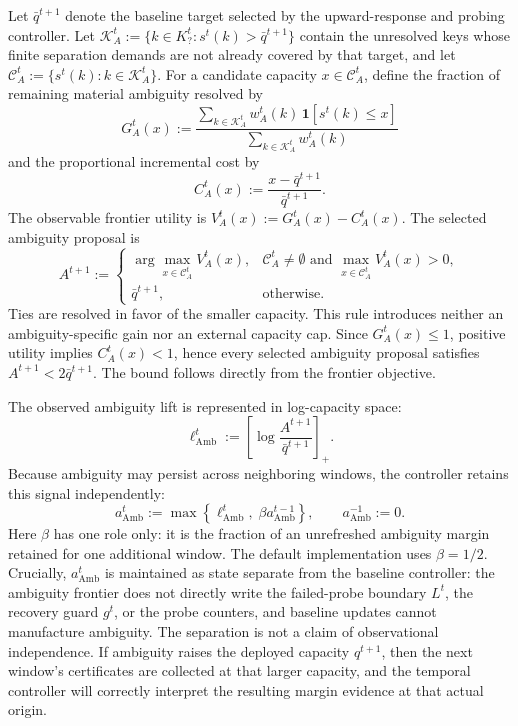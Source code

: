 \documentclass[sigconf, nonacm]{acmart}
\begin{document}
Let \(\bar q^{t+1}\) denote the baseline target selected by the upward-response and probing controller. Let \(\mathcal K_A^t:=\{k\in K_?^t:s^t(k)>\bar q^{t+1}\}\) contain the unresolved keys whose finite separation demands are not already covered by that target, and let \(\mathcal C_A^t:=\{s^t(k):k\in\mathcal K_A^t\}\). For a candidate capacity \(x\in\mathcal C_A^t\), define the fraction of remaining material ambiguity resolved by
\begin{equation}
\label{eq:ambiguity-gain}
G_A^t(x)
:=
\frac{\sum_{k\in\mathcal K_A^t}
w_A^t(k)\,
\mathbf 1[s^t(k)\le x]}
{\sum_{k\in\mathcal K_A^t}w_A^t(k)}
\end{equation}
and the proportional incremental cost by
\begin{equation}
\label{eq:ambiguity-cost}
C_A^t(x)
:=
\frac{x-\bar q^{t+1}}{\bar q^{t+1}}.
\end{equation}
The observable frontier utility is \(V_A^t(x):=G_A^t(x)-C_A^t(x)\). The selected ambiguity proposal is
\begin{equation}
\label{eq:qamb-window}
A^{t+1}
:=
\begin{cases}
\arg\max_{x\in\mathcal C_A^t}V_A^t(x),
& \mathcal C_A^t\neq\emptyset
\text{ and }\max_{x\in\mathcal C_A^t}V_A^t(x)>0,\\[1ex]
\bar q^{t+1}, & \text{otherwise}.
\end{cases}
\end{equation}
Ties are resolved in favor of the smaller capacity. This rule introduces neither an ambiguity-specific gain nor an external capacity cap. Since \(G_A^t(x)\le 1\), positive utility implies \(C_A^t(x)<1\), hence every selected ambiguity proposal satisfies \(A^{t+1}<2\bar q^{t+1}\). The bound follows directly from the frontier objective.

The observed ambiguity lift is represented in log-capacity space:
\begin{equation}
\label{eq:ambiguity-observed-margin}
\ell_{\mathrm{Amb}}^t
:=
\left[
\log\frac{A^{t+1}}{\bar q^{t+1}}
\right]_+.
\end{equation}
Because ambiguity may persist across neighboring windows, the controller retains this signal independently:
\begin{equation}
\label{eq:ambiguity-persisted-margin}
a_{\mathrm{Amb}}^t
:=
\max\!\left\{
\ell_{\mathrm{Amb}}^t,\;
\beta a_{\mathrm{Amb}}^{t-1}
\right\},
\qquad a_{\mathrm{Amb}}^{-1}:=0.
\end{equation}
Here \(\beta\) has one role only: it is the fraction of an unrefreshed ambiguity margin retained for one additional window. The default implementation uses \(\beta=1/2\). Crucially, \(a_{\mathrm{Amb}}^t\) is maintained as state separate from the baseline controller: the ambiguity frontier does not directly write the failed-probe boundary \(L^t\), the recovery guard \(g^t\), or the probe counters, and baseline updates cannot manufacture ambiguity. The separation is not a claim of observational independence. If ambiguity raises the deployed capacity \(q^{t+1}\), then the next window's certificates are collected at that larger capacity, and the temporal controller will correctly interpret the resulting margin evidence at that actual origin.
\end{document}
